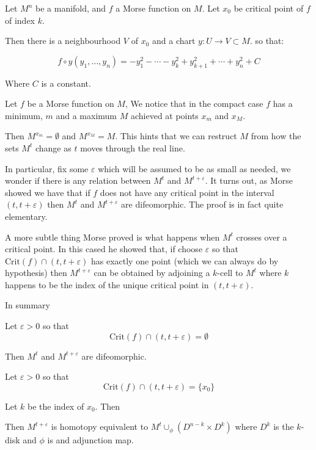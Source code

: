 \begin{theorem}
\cite{mat1997}
Let $M^n$ be a manifold, and $f$ a Morse function on $M$.
Let $x_0$ be critical point of $f$ of index $k$.


Then there is a neighbourhood $V$ of $x_0$ and a chart 
$y:U\to V\subset M$. so that:

$$
f\circ y (y_1,\ldots,y_n)
=
-y_1^2
-\cdots
-y_k^2
+y_{k+1}^2
+\cdots
+y_n^2
+C
$$

Where $C$ is a constant.
\end{theorem}

Let $f$ be a Morse function on $M$,
We notice that in the compact case $f$ has 
a minimum, $m$ and a maximum $M$
achieved at points $x_m$ and $x_M$.

Then $M^{x_m}=\emptyset$ and $M^{x_M}=M$.
This hints that we can restruct $M$ from how the sets $M^t$
change as $t$ moves through the real line.

In particular, fix some $\varepsilon$ which will be assumed to be
as small as needed, we wonder if there is any relation between $M^t$
and $M^{t+\varepsilon}$. It turns out, as Morse \cite{mor1934} showed
we have that if $f$ does not have any critical point in the interval 
$(t,t+\varepsilon)$ then
 $M^t$ and $M^{t+\varepsilon}$ are difeomorphic. The proof is
 in fact quite elementary.
 
 A more subtle thing Morse proved is what happens when $M^t$
 crosses over a critical point. In this cased he showed that,
 if choose $\varepsilon$ so that $\text{Crit}(f)\cap (t,t+\varepsilon)$
 has exactly one point (which we can always do by hypothesis)
 then
  $M^{t+\varepsilon}$ can be obtained by adjoining a $k$-cell to $M^t$
 where $k$ happens to be the index of the unique critical point in 
$(t,t+\varepsilon)$.


In summary

\begin{theorem}
\cite{mor1934}
Let $\varepsilon>0$ so that
$$\text{Crit}(f)\cap (t,t+\varepsilon)=\emptyset$$

Then   $M^{t}$ and $M^{t+\varepsilon}$ 
are difeomorphic.


\end{theorem}

\begin{theorem}
\cite{mor1934}
Let $\varepsilon>0$ so that
$$\text{Crit}(f)\cap (t,t+\varepsilon)=\{x_0\}$$

Let $k$ be the index of $x_0$. Then

Then  $M^{t+\varepsilon}$ 
is homotopy equivalent to $M^t\cup_\phi (D^{n-k}\times D^k)$ where
$D^k$ is the $k$-disk and $\phi$ is and adjunction map.


\end{theorem}

